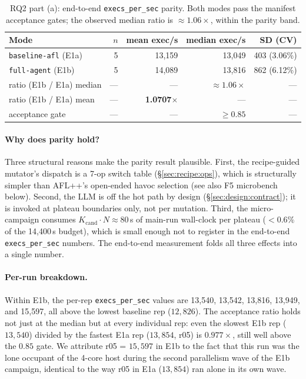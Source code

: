 \documentclass[11pt]{article}
\begin{document}
\begin{table}[t]
  \centering
  \footnotesize
  \setlength{\tabcolsep}{7pt}
  \begin{tabular}{@{}lrrrr@{}}
    \toprule
    Mode & $n$ & mean exec/s & median exec/s & SD (CV) \\
    \midrule
    \texttt{baseline-afl} (E1a) & 5 & 13{,}159 & 13{,}049 & 403 (3.06\%) \\
    \texttt{full-agent}   (E1b) & 5 & 14{,}089 & 13{,}816 & 862 (6.12\%) \\
    \midrule
    ratio (E1b / E1a) median  & --- & --- & \textbf{$\approx 1.06\times$} & --- \\
    ratio (E1b / E1a) mean    & --- & \textbf{1.0707$\times$} & --- & --- \\
    acceptance gate           & --- & --- & $\geq 0.85$ & --- \\
    \bottomrule
  \end{tabular}
  \caption{RQ2 part (a): end-to-end \texttt{execs\_per\_sec} parity.
  Both modes pass the manifest acceptance gates; the observed median
  ratio is $\approx 1.06\times$, within the parity band.}
  \label{tab:throughput-parity}
\end{table}

\paragraph{Why does parity hold?}
Three structural reasons make the parity result plausible. First, the recipe-guided mutator's
dispatch is a 7-op switch table (\S\ref{sec:recipe:ops}), which
is structurally simpler than AFL++'s open-ended havoc selection
(see also F5 microbench below). Second, the LLM is off the hot
path by design (\S\ref{sec:design:contract}); it is invoked at
plateau boundaries only, not per mutation. Third, the
micro-campaign consumes $K_{\text{cand}} \cdot N \approx 80\,$s of
main-run wall-clock per plateau ($< 0.6\%$ of the 14{,}400\,s
budget), which is small enough not to register in the end-to-end
\texttt{execs\_per\_sec} numbers. The end-to-end measurement folds
all three effects into a single number.

\paragraph{Per-run breakdown.}
Within E1b, the per-rep \texttt{execs\_per\_sec} values are
13{,}540, 13{,}542, 13{,}816, 13{,}949, and 15{,}597, all above
the lowest baseline rep ($12{,}826$). The acceptance ratio holds
not just at the median but at every individual rep: even the
slowest E1b rep ($13{,}540$) divided by the fastest E1a rep
($13{,}854$, r05) is $0.977\times$, still well above the $0.85$
gate. We attribute r05 = $15{,}597$ in E1b to the fact that this
run was the lone occupant of the 4-core host during the second
parallelism wave of the E1b campaign, identical to the way r05
in E1a ($13{,}854$) ran alone in its own wave.
\end{document}
